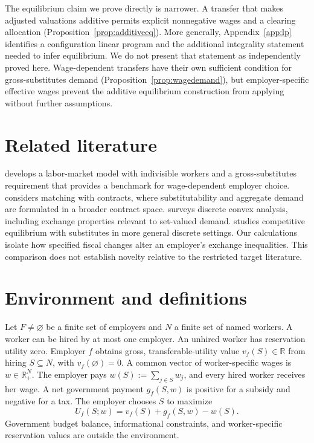 \documentclass[11pt]{article}
\theoremstyle{definition}
\theoremstyle{remark}
\numberwithin{equation}{section}
\begin{document}
The equilibrium claim we prove directly is narrower. A transfer that makes adjusted valuations additive permits explicit nonnegative wages and a clearing allocation (Proposition~\ref{prop:additiveeq}). More generally, Appendix~\ref{app:lp} identifies a configuration linear program and the additional integrality statement needed to infer equilibrium. We do not present that statement as independently proved here. Wage-dependent transfers have their own sufficient condition for gross-substitutes demand (Proposition~\ref{prop:wagedemand}), but employer-specific effective wages prevent the additive equilibrium construction from applying without further assumptions.

\section{Related literature}
\citet{KelsoCrawford1982} develops a labor-market model with indivisible workers and a gross-substitutes requirement that provides a benchmark for wage-dependent employer choice. \citet{HatfieldMilgrom2005} considers matching with contracts, where substitutability and aggregate demand are formulated in a broader contract space. \citet{Murota2022} surveys discrete convex analysis, including exchange properties relevant to set-valued demand. \citet{ChenEtAl2023} studies competitive equilibrium with substitutes in more general discrete settings. Our calculations isolate how specified fiscal changes alter an employer's exchange inequalities. This comparison does not establish novelty relative to the restricted target literature.

\section{Environment and definitions}
Let $F\ne\varnothing$ be a finite set of employers and $N$ a finite set of named workers. A worker can be hired by at most one employer. An unhired worker has reservation utility zero. Employer $f$ obtains gross, transferable-utility value $v_f(S)\in\mathbb R$ from hiring $S\subseteq N$, with $v_f(\varnothing)=0$. A common vector of worker-specific wages is $w\in\mathbb R_+^N$. The employer pays $w(S):=\sum_{j\in S}w_j$, and every hired worker receives her wage. A net government payment $g_f(S,w)$ is positive for a subsidy and negative for a tax. The employer chooses $S$ to maximize
\begin{equation}
 U_f(S;w)=v_f(S)+g_f(S,w)-w(S).                 \label{eq:profit}
\end{equation}
Government budget balance, informational constraints, and worker-specific reservation values are outside the environment.
\end{document}
